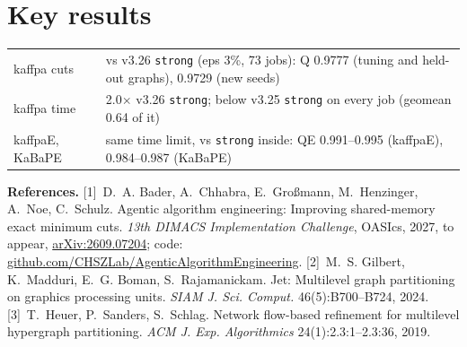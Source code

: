 \documentclass[10pt]{article}
\newcommand{\cfg}[1]{\texttt{#1}}
\begin{document}
\section{Key results}
\begin{tabular}{@{}ll@{}}
\toprule
kaffpa cuts & vs v3.26 \cfg{strong} (eps 3\%, 73 jobs): Q 0.9777 (tuning and held-out graphs), 0.9729 (new seeds)\\
kaffpa time & 2.0$\times$ v3.26 \cfg{strong}; below v3.25 \cfg{strong} on every job (geomean 0.64 of it)\\
kaffpaE, KaBaPE & same time limit, vs \cfg{strong} inside: QE 0.991--0.995 (kaffpaE), 0.984--0.987 (KaBaPE)\\
\bottomrule
\end{tabular}


\vspace{2pt}
{\footnotesize\textbf{References.}
[1]~D.~A. Bader, A.~Chhabra, E.~Gro{\ss}mann, M.~Henzinger, A.~Noe, C.~Schulz. Agentic algorithm engineering: Improving shared-memory exact minimum cuts. \emph{13th DIMACS Implementation Challenge}, OASIcs, 2027, to appear, \href{https://arxiv.org/abs/2609.07204}{arXiv:2609.07204}; code: \href{https://github.com/CHSZLab/AgenticAlgorithmEngineering}{github.com/CHSZLab/AgenticAlgorithmEngineering}.
[2]~M.~S. Gilbert, K.~Madduri, E.~G. Boman, S.~Rajamanickam. Jet: Multilevel graph partitioning on graphics processing units. \emph{SIAM J. Sci. Comput.} 46(5):B700--B724, 2024.
[3]~T.~Heuer, P.~Sanders, S.~Schlag. Network flow-based refinement for multilevel hypergraph partitioning. \emph{ACM J. Exp. Algorithmics} 24(1):2.3:1--2.3:36, 2019.\par}
\end{document}
